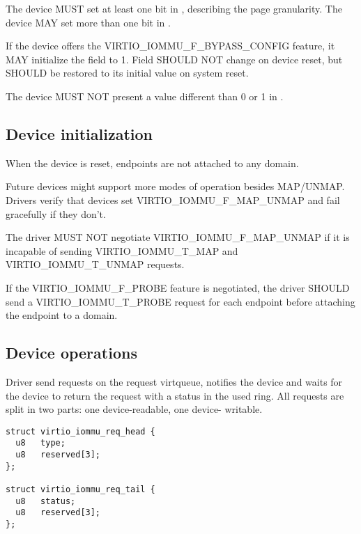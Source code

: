 The device MUST set at least one bit in , describing
the page granularity. The device MAY set more than one bit in
.

If the device offers the VIRTIO_IOMMU_F_BYPASS_CONFIG feature, it
MAY initialize the  field to 1. Field
 SHOULD NOT change on device reset, but SHOULD be
restored to its initial value on system reset.

The device MUST NOT present a value different than 0 or 1 in
.

\subsection{Device initialization}\label{sec:Device Types / IOMMU Device / Device initialization}

When the device is reset, endpoints are not attached to any domain.

Future devices might support more modes of operation besides MAP/UNMAP.
Drivers verify that devices set VIRTIO_IOMMU_F_MAP_UNMAP and fail
gracefully if they don't.


The driver MUST NOT negotiate VIRTIO_IOMMU_F_MAP_UNMAP if it is incapable
of sending VIRTIO_IOMMU_T_MAP and VIRTIO_IOMMU_T_UNMAP requests.

If the VIRTIO_IOMMU_F_PROBE feature is negotiated, the driver SHOULD send a
VIRTIO_IOMMU_T_PROBE request for each endpoint before attaching the
endpoint to a domain.

\subsection{Device operations}\label{sec:Device Types / IOMMU Device / Device operations}

Driver send requests on the request virtqueue, notifies the device and
waits for the device to return the request with a status in the used ring.
All requests are split in two parts: one device-readable, one device-
writable.

\begin{lstlisting}
struct virtio_iommu_req_head {
  u8   type;
  u8   reserved[3];
};

struct virtio_iommu_req_tail {
  u8   status;
  u8   reserved[3];
};
\end{lstlisting}

